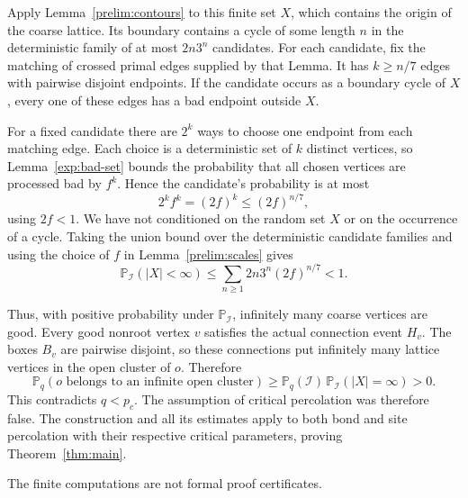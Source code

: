 \documentclass[11pt]{article}
\theoremstyle{definition}
\theoremstyle{remark}
\numberwithin{equation}{section}
\begin{document}
Apply Lemma~\ref{prelim:contours} to this finite set $X$, which contains
the origin of the coarse lattice. Its boundary contains a cycle of
some length $n$ in the deterministic family of at most $2n3^n$
candidates. For each candidate, fix the matching of crossed primal
edges supplied by that Lemma. It has $k\ge n/7$ edges with pairwise
disjoint endpoints. If the candidate occurs as a boundary cycle of
$X$, every one of these edges has a bad endpoint outside $X$.

For a fixed candidate there are $2^k$ ways to choose one endpoint from
each matching edge. Each choice is a deterministic set of $k$ distinct
vertices, so Lemma~\ref{exp:bad-set} bounds the probability that all
chosen vertices are processed bad by $f^k$. Hence the candidate's
probability is at most
\[
 2^k f^k=(2f)^k\le(2f)^{n/7},
\]
using $2f<1$. We have not conditioned on the random set $X$ or on the
occurrence of a cycle. Taking the union bound over the deterministic
candidate families and using the choice of $f$ in
Lemma~\ref{prelim:scales} gives
\begin{equation}
 \mathbb P_{\mathcal I}(|X|<\infty)
 \le\sum_{n\ge1}2n3^n(2f)^{n/7}<1.
 \label{exp:infinite-good}
\end{equation}

Thus, with positive probability under $\mathbb P_{\mathcal I}$,
infinitely many coarse vertices are good. Every good nonroot vertex
$v$ satisfies the actual connection event $H_v$. The boxes $B_v$ are
pairwise disjoint, so these connections put infinitely many lattice
vertices in the open cluster of $o$. Therefore
\[
 \mathbb P_q(o\text{ belongs to an infinite open cluster})
 \ge \mathbb P_q(\mathcal I)\,
       \mathbb P_{\mathcal I}(|X|=\infty)>0.
\]
This contradicts $q<p_c$. The assumption of critical percolation was
therefore false. The construction and all its estimates apply to
both bond and site percolation with their respective critical
parameters, proving Theorem~\ref{thm:main}.

The finite computations are not formal proof certificates.
\end{document}
